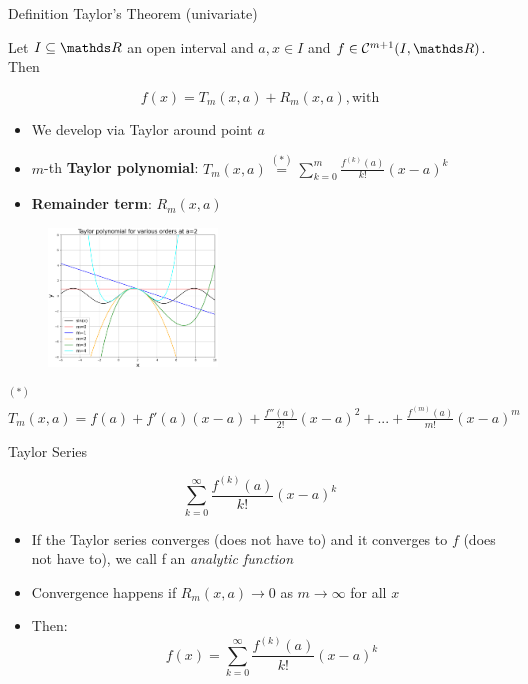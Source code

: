 \begin{vbframe}{Definition Taylor's Theorem (univariate)}

\vspace*{-0.1cm}

Let $I \subseteq \R$ an open interval and $a, x \in I$ and $f \in \mathcal{C}^{m+1}(I,\R)$. Then 

\vspace*{-0.1cm}

$$f(x) = T_{m}(x,a) + R_{m}(x,a), \text{with}$$ 


    \begin{itemize}
      \item We develop via Taylor around point $a$
      \item $m$-th \textbf{Taylor polynomial}: $T_{m}(x,a) \overset{(*)}{=} \sum_{k=0}^{m} \frac{f^{(k)}(a)}{k!}(x-a)^{k}$ 
      \item \textbf{Remainder term}: $R_m(x, a)$ %
    \end{itemize}

\vspace*{-0.3cm}

    \begin{figure}[htp]
        \centering
        \includegraphics[width=0.4\textwidth]{figure_man/taylor_univariate.png}
    \end{figure}

    \begin{footnotesize}
      $^{(*)}$ $T_{m}(x,a) = f(a) + f'(a)(x-a) + \frac{f''(a)}{2!}(x-a)^{2} + ... + \frac{f^{(m)}(a)}{m!} (x - a)^m$
    \end{footnotesize}

    
\end{vbframe}

\begin{vbframe}{Taylor Series}

$$\sum_{k=0}^{\infty} \frac{f^{(k)}(a)}{k!}(x-a)^{k} $$

\vspace*{2cm}

    \begin{itemize}
      \item If the Taylor series converges (does not have to) and it converges to $f$ (does not  have to), we call f an \emph{analytic function}
      \item Convergence happens if $R_m(x, a) \rightarrow 0$ as $m \rightarrow \infty$ for all $x$
      \item Then:
$$f(x) = \sum_{k=0}^{\infty} \frac{f^{(k)}(a)}{k!}(x-a)^{k} $$
    \end{itemize}
    
\end{vbframe}





